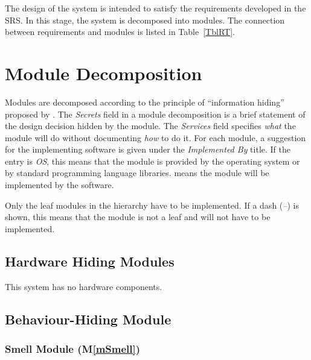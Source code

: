 \documentclass[12pt, titlepage]{article}
\newcommand{\mref}[1]{M\ref{#1}}
\begin{document}
The design of the system is intended to satisfy the requirements developed in
the SRS. In this stage, the system is decomposed into modules. The connection
between requirements and modules is listed in Table~\ref{TblRT}.


\section{Module Decomposition} \label{SecMD}

Modules are decomposed according to the principle of ``information hiding''
proposed by \citet{ParnasEtAl1984}. The \emph{Secrets} field in a module
decomposition is a brief statement of the design decision hidden by the
module. The \emph{Services} field specifies \emph{what} the module will do
without documenting \emph{how} to do it. For each module, a suggestion for the
implementing software is given under the \emph{Implemented By} title. If the
entry is \emph{OS}, this means that the module is provided by the operating
system or by standard programming language libraries.  \emph{\progname{}} means the
module will be implemented by the \progname{} software.

Only the leaf modules in the hierarchy have to be implemented. If a dash
(\emph{--}) is shown, this means that the module is not a leaf and will not have
to be implemented.

\subsection{Hardware Hiding Modules}

This system has no hardware components.

\subsection{Behaviour-Hiding Module}

\subsubsection{Smell Module (\mref{mSmell})}
\end{document}
